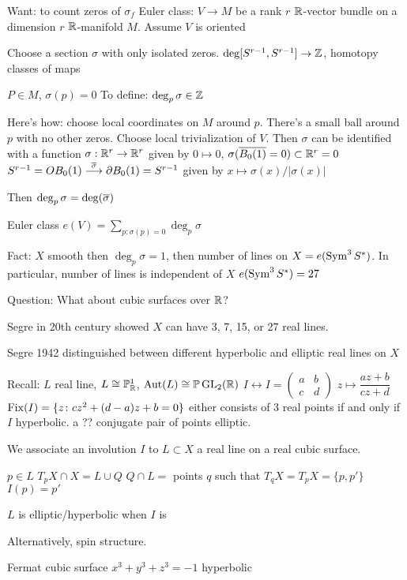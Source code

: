 Want: to count zeros of $\sigma_f$
Euler class: $V \to M$ be a rank $r$ $\mathbb{R}$-vector bundle on a dimension $r$ $\mathbb{R}$-manifold $M$. Assume $V$ is oriented 

Choose a section $\sigma$ with only isolated zeros.
$\deg [S^{r-1},S^{r-1}] \to \mathbb{Z}$, homotopy classes of maps

$P \in M$, $\sigma(p)=0$
To define: $\deg_p \sigma \in \mathbb{Z}$

Here's how: choose local coordinates on $M$ around $p$. There's a small ball around $p$ with no other zeros. Choose local trivialization of $V$. Then $\sigma$ can be identified with a function $\sigma: \mathbb{R}^r \to \mathbb{R}^r$ given by $0 \mapsto 0$, $\sigma(\overline{B_0(1)}=0) \subset \mathbb{R}^r=0$
$S^{r-1}= OB_0(1) \stackrel{\overline{\sigma}}{\longrightarrow} \partial B_0(1)= S^{r-1}$ given by $x \mapsto \sigma(x)/|\sigma(x)|$


Then $\deg_p \sigma= \deg(\overline{\sigma})$

Euler class 
$e(V)= \sum_{p: \sigma(p)=0} \deg_p \sigma$

Fact: $X$ smooth then $\deg_p \sigma=1$, then number of lines on $X= e(\operatorname{Sym}^3S^*)$. In particular, number of lines is independent of $X$
$e(\operatorname{Sym}^3S^*)=27$


Question: What about cubic surfaces over $\mathbb{R}$?

Segre in 20th century showed $X$ can have 3, 7, 15, or 27 real lines.


Segre 1942 distinguished between different hyperbolic and elliptic real lines on $X$

Recall: $L$ real line, $L \cong \mathbb{P}_{\mathbb{R}}^1$, $\operatorname{Aut}(L) \cong \mathbb{P} \operatorname{GL}_2(\mathbb{R})$
$I \leftrightarrow I = \begin{pmatrix} a & b \\ c & d \end{pmatrix}$
$z \mapsto \dfrac{az+b}{cz+d}$
$\operatorname{Fix}(I)= \{z \colon cz^2+(d-a)z+b=0\}$
either consists of 3 real points if and only if $I$ hyperbolic. a ?? conjugate pair of points elliptic.


We associate an involution $I$ to $L \subset X$ a real line on a real cubic surface.

$p \in L$
$T_p X \cap X= L \cup Q$
$Q \cap L=$ points $q$ such that $T_qX= T_pX= \{p,p'\}$
$I(p)= p'$

\begin{dfn}
$L$ is elliptic/hyperbolic when $I$ is 
\end{dfn}

Alternatively, spin structure.


\begin{ex}
Fermat cubic surface $x^3+y^3+z^3= -1$
hyperbolic
\end{ex}


